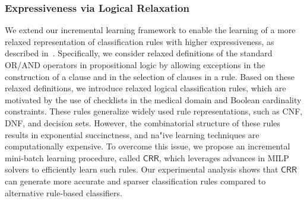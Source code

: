 \documentclass[11pt]{article}
\begin{document}
	\subsubsection*{Expressiveness via Logical Relaxation}
	We extend our incremental learning framework to enable the learning of a more relaxed representation of classification rules with higher expressiveness, as described in~\cite{ghosh2020classification}. Specifically, we consider relaxed definitions of the standard OR/AND operators in propositional logic by allowing exceptions in the construction of a clause and in the selection of clauses in a rule. Based on these relaxed definitions, we introduce relaxed logical classification rules, which are motivated by the use of checklists in the medical domain and Boolean cardinality constraints. These rules generalize widely used rule representations, such as CNF, DNF, and decision sets. However, the combinatorial structure of these rules results in exponential succinctness, and na"ive learning techniques are computationally expensive. To overcome this issue, we propose an incremental mini-batch learning procedure, called $\mathsf{CRR}$, which leverages advances in MILP solvers to efficiently learn such rules. Our experimental analysis shows that $\mathsf{CRR}$ can generate more accurate and sparser classification rules compared to alternative rule-based classifiers.
	
	
	
	
	
\end{document}

